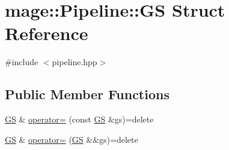 \hypertarget{structmage_1_1_pipeline_1_1_g_s}{}\section{mage\+:\+:Pipeline\+:\+:GS Struct Reference}
\label{structmage_1_1_pipeline_1_1_g_s}


{\ttfamily \#include $<$pipeline.\+hpp$>$}

\subsection*{Public Member Functions}
\begin{DoxyCompactItemize}
\item 
\hyperlink{structmage_1_1_pipeline_1_1_g_s}{GS} \& \hyperlink{structmage_1_1_pipeline_1_1_g_s_a126e875a6f24382f1de47203c6fba2fe}{operator=} (const \hyperlink{structmage_1_1_pipeline_1_1_g_s}{GS} \&gs)=delete
\item 
\hyperlink{structmage_1_1_pipeline_1_1_g_s}{GS} \& \hyperlink{structmage_1_1_pipeline_1_1_g_s_af7ed4aa0e59d3cac1a9664eb0809c4aa}{operator=} (\hyperlink{structmage_1_1_pipeline_1_1_g_s}{GS} \&\&gs)=delete
\end{DoxyCompactItemize}
